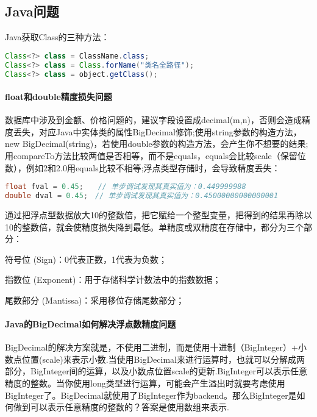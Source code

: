 \documentclass[../../../interview-questions.tex]{subfiles}
\begin{document}
\subsection{Java问题}

Java获取Class的三种方法：

\begin{lstlisting}[language=Java]
Class<?> class = ClassName.class;
Class<?> class = Class.forName("类名全路径");
Class<?> class = object.getClass();
\end{lstlisting}

\paragraph{float和double精度损失问题}

数据库中涉及到金额、价格问题的，建议字段设置成decimal(m,n)，否则会造成精度丢失，对应Java中实体类的属性BigDecimal修饰;使用string参数的构造方法，new  BigDecimal(string)，若使用double参数的构造方法，会产生你不想要的结果;用compareTo方法比较两值是否相等，而不是equals，equals会比较scale（保留位数），例如2和2.0用equals比较不相等;浮点类型存储时，会导致精度丢失：

\begin{lstlisting}[language=Java]
float fval = 0.45;　　// 单步调试发现其真实值为：0.449999988
double dval = 0.45;　// 单步调试发现其真实值为：0.45000000000000001
\end{lstlisting}

通过把浮点型数据放大10的整数倍，把它赋给一个整型变量，把得到的结果再除以10的整数倍，就会使精度损失降到最低。单精度或双精度在存储中，都分为三个部分：

符号位 (Sign)：0代表正数，1代表为负数；

指数位 (Exponent)：用于存储科学计数法中的指数数据；

尾数部分 (Mantissa)：采用移位存储尾数部分；

\paragraph{Java的BigDecimal如何解决浮点数精度问题}

BigDecimal的解决方案就是，不使用二进制，而是使用十进制（BigInteger）+小数点位置(scale)来表示小数.当使用BigDecimal来进行运算时，也就可以分解成两部分，BigInteger间的运算，以及小数点位置scale的更新.BigInteger可以表示任意精度的整数。当你使用long类型进行运算，可能会产生溢出时就要考虑使用BigInteger了。BigDecimal就使用了BigInteger作为backend。那么BigInteger是如何做到可以表示任意精度的整数的？答案是使用数组来表示.
\end{document}
